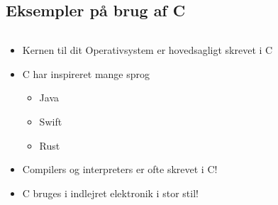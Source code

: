 \documentclass{beamer}
\begin{document}
\subsection{Eksempler på brug af C}
\begin{frame}
	\begin{columns}
	
	\begin{column}{0.5\textwidth}
	\begin{itemize}
	\item{Kernen til dit Operativsystem er hovedsagligt skrevet i C}
	\item{C har inspireret mange sprog}
		\begin{itemize}
		\item{Java}
		\item{Swift}
		\item{Rust}
		\end{itemize}
	\item{Compilers og interpreters er ofte skrevet i C!}
	\item{C bruges i indlejret elektronik i stor stil!}
	\end{itemize}
	\end{column}
	
	\
	
	\end{columns}
\end{frame}
\end{document}
